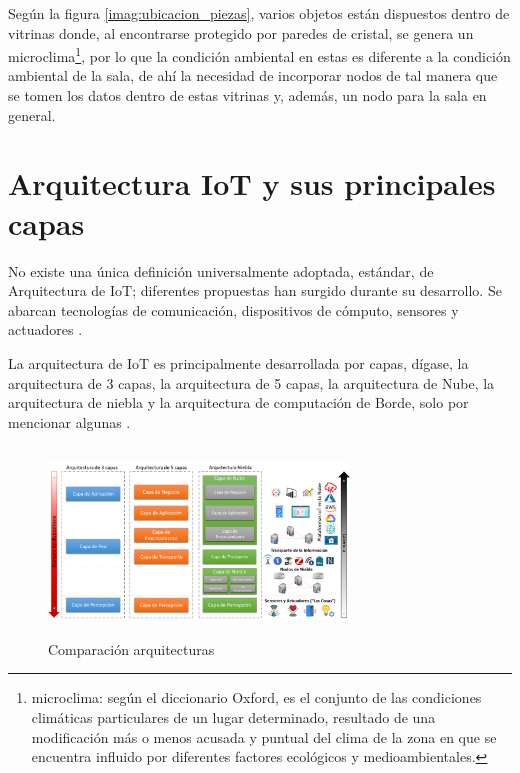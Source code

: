     Según la figura \ref{imag:ubicacion_piezas}, varios objetos están dispuestos dentro de vitrinas donde, al encontrarse protegido por paredes de cristal, se genera un microclima\footnote{microclima: según el diccionario Oxford, es el conjunto de las condiciones climáticas particulares de un lugar determinado, resultado de una modificación más o menos acusada y puntual del clima de la zona en que se encuentra influido por diferentes factores ecológicos y medioambientales.}, por lo que la condición ambiental en estas es diferente a la condición ambiental de la sala, de ahí la necesidad de incorporar nodos de tal manera que se tomen los datos dentro de estas vitrinas y, además, un nodo para la sala en general.

    \section{Arquitectura IoT y sus principales capas}\label{sec:arquitecturas}

    No existe una única definición universalmente adoptada, estándar, de Arquitectura de IoT; diferentes propuestas han surgido durante su desarrollo. Se abarcan tecnologías de comunicación, dispositivos de cómputo, sensores y actuadores \cite{ioT_en_Cosas_de_salud}.
    
    La arquitectura de IoT es principalmente desarrollada por capas, dígase, la arquitectura de 3 capas, la arquitectura de 5 capas, la arquitectura de Nube, la arquitectura de niebla y la arquitectura de computación de Borde, solo por mencionar algunas \cite{arquitecturaIEEE}.\\

    \begin{figure}[H]
        \centering
        \includegraphics[width=8cm, height=5cm]{imagenes/Comparacion-arquitecturas-1024x535}
        \caption{Comparación arquitecturas}
        \label{imag:comparacionArquitecturas}
    \end{figure}

